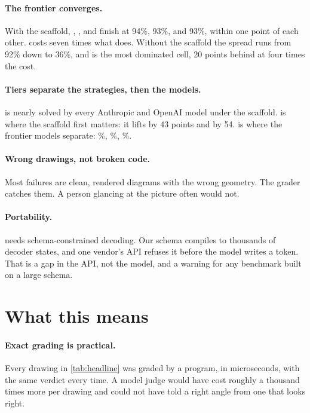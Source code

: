 \documentclass{article}
\begin{document}
\paragraph{The frontier converges.}
With the scaffold, \gpt, \sonnet, and \opus finish at 94\%, 93\%, and 93\%, within one point of each other.
\opus costs seven times what \gpt does.
Without the scaffold the spread runs from 92\% down to 36\%, and \opus is the most dominated cell, 20 points behind \gpt at four times the cost.

\paragraph{Tiers separate the strategies, then the models.}
\tone is nearly solved by every Anthropic and OpenAI model under the scaffold.
\ttwo is where the scaffold first matters: it lifts \opus by 43 points and \geminipro by 54.
\tthree is where the frontier models separate: \%, \%, \%.

\paragraph{Wrong drawings, not broken code.}
Most failures are clean, rendered diagrams with the wrong geometry.
The grader catches them.
A person glancing at the picture often would not.

\paragraph{Portability.}
\structured needs schema-constrained decoding.
Our schema compiles to thousands of decoder states, and one vendor's API refuses it before the model writes a token.
That is a gap in the API, not the model, and a warning for any benchmark built on a large schema.

\section{What this means}
\label{sec:discussion}

\paragraph{Exact grading is practical.}
Every drawing in \cref{tab:headline} was graded by a program, in microseconds, with the same verdict every time.
A model judge would have cost roughly a thousand times more per drawing and could not have told a right angle from one that looks right.
\end{document}
